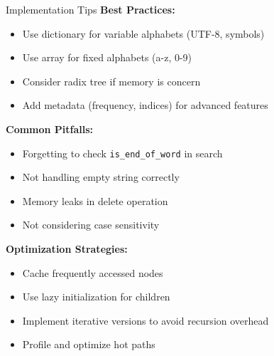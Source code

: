 \documentclass[aspectratio=169]{beamer}
\begin{document}
\begin{frame}{Implementation Tips}
  \textbf{Best Practices:}
  \begin{itemize}
    \item Use dictionary for variable alphabets (UTF-8, symbols)
    \item Use array for fixed alphabets (a-z, 0-9)
    \item Consider radix tree if memory is concern
    \item Add metadata (frequency, indices) for advanced features
  \end{itemize}

  \vspace{0.3cm}
  \textbf{Common Pitfalls:}
  \begin{itemize}
    \item Forgetting to check \texttt{is\_end\_of\_word} in search
    \item Not handling empty string correctly
    \item Memory leaks in delete operation
    \item Not considering case sensitivity
  \end{itemize}

  \vspace{0.3cm}
  \textbf{Optimization Strategies:}
  \begin{itemize}
    \item Cache frequently accessed nodes
    \item Use lazy initialization for children
    \item Implement iterative versions to avoid recursion overhead
    \item Profile and optimize hot paths
  \end{itemize}
\end{frame}
\end{document}
